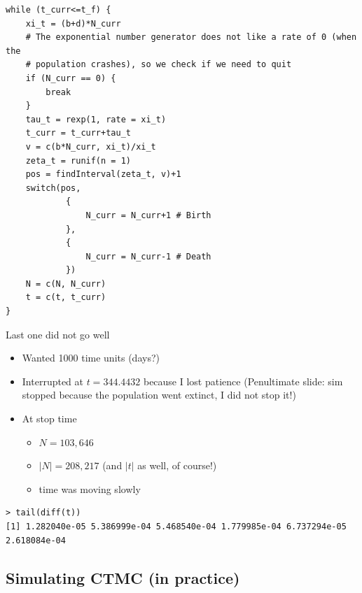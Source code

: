 \documentclass[aspectratio=43]{beamer}
\begin{document}
\begin{frame}[fragile]
\begin{lstlisting}[language=Renhanced]
while (t_curr<=t_f) {
    xi_t = (b+d)*N_curr
    # The exponential number generator does not like a rate of 0 (when the 
    # population crashes), so we check if we need to quit
    if (N_curr == 0) {
        break
    }
    tau_t = rexp(1, rate = xi_t)
    t_curr = t_curr+tau_t
    v = c(b*N_curr, xi_t)/xi_t
    zeta_t = runif(n = 1)
    pos = findInterval(zeta_t, v)+1
    switch(pos,
            { 
                N_curr = N_curr+1 # Birth
            },
            {
                N_curr = N_curr-1 # Death
            })
    N = c(N, N_curr)
    t = c(t, t_curr)
}
\end{lstlisting}
\end{frame}



\begin{frame}[fragile]{Last one did not go well}
    \begin{itemize}
        \item Wanted 1000 time units (days?)
        \item Interrupted at $t=344.4432$ because I lost patience
        \newline (Penultimate slide: sim stopped because the population went extinct, I did not stop it!)
        \item At stop time
        \begin{itemize}
            \item $N = 103,646$
            \item $|N| = 208,217$ (and $|t|$ as well, of course!)
            \item time was moving slowly
        \end{itemize}
    \end{itemize}
    \vfill
    \begin{lstlisting}
> tail(diff(t))
[1] 1.282040e-05 5.386999e-04 5.468540e-04 1.779985e-04 6.737294e-05 2.618084e-04
    \end{lstlisting}
\end{frame}



\subsection{Simulating CTMC (in practice)}
\end{document}
